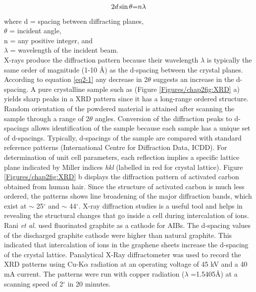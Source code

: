  \begin{equation} \label{eq2-1}
     2d\sin\theta \text= n{\lambda}
 \end{equation}
 where d = spacing between diffracting planes,\\
$\theta$ = incident angle,\\ 
n = any positive integer, and \\
$\lambda$ = wavelength of the incident beam.\\
X-rays produce the diffraction pattern because their wavelength $\lambda$ is typically the same order of magnitude (1-10 \AA) as the d-spacing between the crystal planes. According to equation \ref{eq2-1} any decrease in 2$\theta$ suggests an increase in the d-spacing. A pure crystalline sample such as  (Figure \ref{Figures/chap2fig:XRD} a) yields sharp peaks in a XRD pattern since it has a long-range ordered structure. Random orientation of the powdered material is attained after scanning the sample through a range of 2$\theta$ angles. Conversion of the diffraction peaks to d-spacings allows identification of the sample because each sample has a unique set of d-spacings. Typically, d-spacings of the sample are compared with standard reference patterns (International Centre for Diffraction Data, ICDD). For determination of unit cell parameters, each reflection implies a specific lattice plane indicated by Miller indices \textit{hkl} (labelled in red  for  crystal lattice). Figure \ref{Figures/chap2fig:XRD} b displays the diffraction pattern of activated carbon obtained from human hair. Since the structure of activated carbon is much less ordered, the patterns shows line broadening of the major diffraction bands, which exist at $\sim$ 25$^{\circ}$  and $\sim$ 44$^{\circ}$.
X-ray diffraction studies is a useful tool and helps in revealing the structural changes that go inside a cell during intercalation of ions. Rani \textit{et al.} used fluorinated graphite as a cathode for AIBs. The d-spacing values of the discharged graphite cathode were higher than natural graphite. This indicated that intercalation of  ions in the graphene sheets increase the d-spacing of the crystal lattice\cite{rani_fluorinated_2013}.
Panalytical X-Ray diffractometer was used to record the XRD patterns using Cu-K$\alpha$ radiation at an operating voltage of 45 kV and a 40 mA current. The patterns were run with copper radiation ($\lambda$ =1.5405\AA) at a scanning speed of 2$^{\circ}$ in 20 minutes. 

